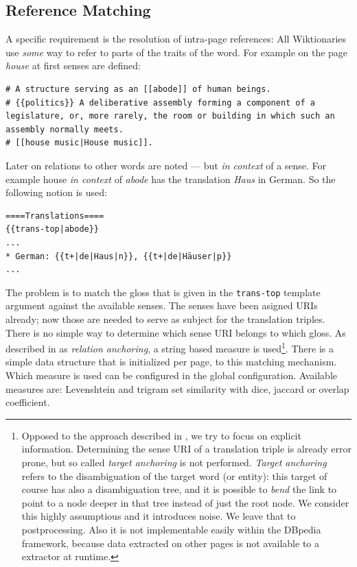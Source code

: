 \subsection{Reference Matching}\label{sec:matching}
A \wik specific requirement is the resolution of intra-page references: All Wiktionaries use \textit{some} way to refer to parts of the traits of the word. 
For example on the page \textit{house} at first senses are defined:
\begin{lstlisting}[basicstyle=\tiny\ttfamily]
# A structure serving as an [[abode]] of human beings.
# {{politics}} A deliberative assembly forming a component of a legislature, or, more rarely, the room or building in which such an assembly normally meets.
# [[house music|House music]].
\end{lstlisting}
Later on relations to other words are noted --- but \textit{in context} of a sense. 
For example house \textit{in context} of \textit{abode} has the translation \textit{Haus} in German. So the following notion is used:
\begin{lstlisting}[basicstyle=\tiny\ttfamily]
====Translations====
{{trans-top|abode}}
...
* German: {{t+|de|Haus|n}}, {{t+|de|Häuser|p}}
...
\end{lstlisting}
The problem is to match the gloss that is given in the \texttt{trans-top} template argument against the available senses.
The senses have been asigned URIs already; now those are needed to serve as subject for the translation triples. There is no simple way to determine which sense URI belongs to which gloss. 
As described in \cite{meyer_2011b} as \textit{relation anchoring}, a string based measure is used\footnote{Opposed to the approach described in \cite{meyer_2011b}, we try to focus on explicit information. Determining the sense URI of a translation triple is already error prone, but so called \textit{target anchoring} is not performed. 
\textit{Target anchoring} refers to the disambiguation of the target word (or entity): this target of course has also a disambiguation tree, and it is possible to \textit{bend} the link to point to a node deeper in that tree instead of just the root node. 
We consider this highly assumptious and it introduces noise. 
We leave that to postprocessing. 
Also it is not implementable easily within the DBpedia framework, because data extracted on other pages is not available to a extractor at runtime.}. 
There is a simple data structure that is initialized per page, to this matching mechanism. Which measure is used can be configured in the global configuration. 
Available measures are: Levenshtein and trigram set similarity with dice, jaccard or overlap coefficient. 
